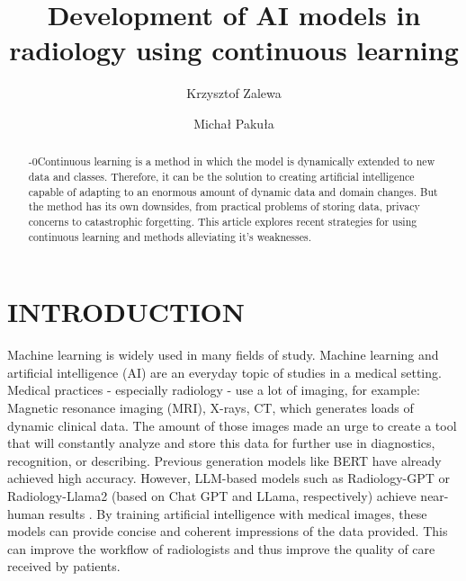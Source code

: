 \documentclass{IEEEcsmag}
\begin{document}
\title{Development of AI models in radiology using continuous learning}

\author{Krzysztof Zalewa}

\author{Michał Pakuła}


\begin{abstract}\looseness-0Continuous learning is a method in which the model is dynamically extended to new data and classes.
Therefore, it can be the solution to creating artificial intelligence capable of adapting to an enormous amount of dynamic data and domain changes. 
But the method has its own downsides, from practical problems of storing data, privacy concerns to catastrophic forgetting. 
This article explores recent strategies for using continuous learning and methods alleviating it's weaknesses.
\end{abstract}

\maketitle

\section{INTRODUCTION}
    Machine learning is widely used in many fields of study.
    Machine learning and artificial intelligence (AI) are an everyday topic of studies in a medical setting.
    Medical practices - especially radiology - use a lot of imaging, for example: Magnetic resonance imaging (MRI), X-rays, CT\cite{cite-5}\cite{cite-20}, which generates loads of dynamic clinical data.
    The amount of those images made an urge to create a tool that will constantly analyze and store this data for further use in diagnostics, recognition, or describing.
    Previous generation models like BERT\cite{cite-24} have already achieved high accuracy\cite{cite-24}. 
    However, LLM-based models such as Radiology-GPT or Radiology-Llama2 (based on Chat GPT and LLama, respectively) achieve near-human results \cite{cite-2}\cite{cite-3}. 
    By training artificial intelligence with medical images, these models can provide concise and coherent impressions of the data provided\cite{cite-3}. 
    This can improve the workflow of radiologists and thus improve the quality of care received by patients.
\end{document}
